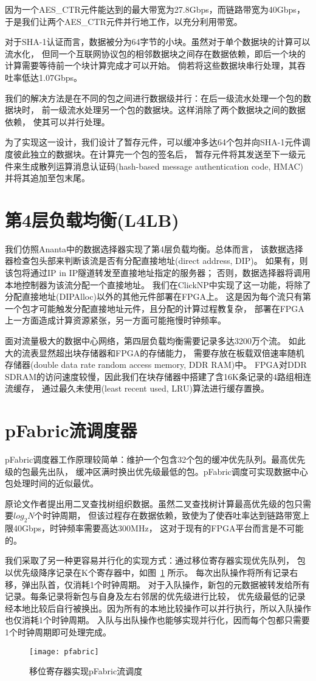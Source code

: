因为一个AES\_CTR元件能达到的最大带宽为27.8Gbps，而链路带宽为40Gbps，
于是我们让两个AES\_CTR元件并行地工作，以充分利用带宽。

对于SHA-1认证而言，数据被分为64字节的小块。虽然对于单个数据块的计算可以流水化，
但同一个互联网协议包的相邻数据块之间存在数据依赖，即后一个块的计算需要等待前一个块计算完成才可以开始。
倘若将这些数据块串行处理，其吞吐率低达1.07Gbps。

我们的解决方法是在不同的包之间进行数据级并行：在后一级流水处理一个包的数据块时，
前一级流水处理另一个包的数据块。这样消除了两个数据块之间的数据依赖，
使其可以并行处理。

为了实现这一设计，我们设计了暂存元件，可以缓冲多达64个包并向SHA-1元件调度彼此独立的数据块。在计算完一个包的签名后，
暂存元件将其发送至下一级元件来生成散列运算消息认证码(hash-based message authentication code, HMAC)并将其追加至包末尾。

\section{第4层负载均衡(L4LB)}
我们仿照Ananta中的数据选择器实现了第4层负载均衡。总体而言，
该数据选择器检查包头部来判断该流是否有分配直接地址(direct address, DIP)。
如果有，则该包将通过IP in IP隧道转发至直接地址指定的服务器；
否则，数据选择器将调用本地控制器为该流分配一个直接地址。
我们在ClickNP中实现了这一功能，将除了分配直接地址(DIPAlloc)以外的其他元件部署在FPGA上。
这是因为每个流只有第一个包才可能触发分配直接地址元件，且分配的计算过程教复杂，
部署在FPGA上一方面造成计算资源紧张，另一方面可能拖慢时钟频率。

面对流量极大的数据中心网络，第四层负载均衡需要记录多达3200万个流。
如此大的流表显然超出块存储器和FPGA的存储能力，
需要存放在板载双倍速率随机存储器(double data rate random access memory, DDR RAM)中。
FPGA对DDR SDRAM的访问速度较慢，因此我们在块存储器中搭建了含16K条记录的4路组相连流缓存，
通过最久未使用(least recent used, LRU)算法进行缓存置换。

\section{pFabric流调度器}
pFabric调度器工作原理较简单：维护一个包含32个包的缓冲优先队列。最高优先级的包最先出队，
缓冲区满时换出优先级最低的包。pFabric调度可实现数据中心包处理时间的近似最优。

原论文作者提出用二叉查找树组织数据。虽然二叉查找树计算最高优先级的包只需要$log_2N$个时钟周期，
但该过程存在数据依赖，致使为了使吞吐率达到链路带宽上限40Gbps，时钟频率需要高达300MHz，
这对于现有的FPGA平台而言是不可能的。

我们采取了另一种更容易并行化的实现方式：通过移位寄存器实现优先队列，
包以优先级降序记录在K个寄存器中，如图~\ref{fig:pfabric} 所示。
每次出队操作将所有记录右移，弹出队首，仅消耗1个时钟周期。
对于入队操作，新包的元数据被转发给所有记录。每条记录将新包与自身及左右邻居的优先级进行比较，
优先级最低的记录经本地比较后自行被换出。因为所有的本地比较操作可以并行执行，所以入队操作也仅消耗1个时钟周期。
入队与出队操作也能够实现并行化，因而每个包都只需要1个时钟周期即可处理完成。
\begin{figure}[ht]
\centering
\texttt{[image: pfabric]}
\caption{移位寄存器实现pFabric流调度} \label{fig:pfabric}
\end{figure}
